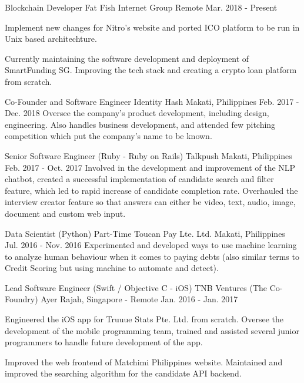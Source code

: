 
\begin{cventries}
    \cventry
        {Blockchain Developer}
        {Fat Fish Internet Group}
        {Remote}
        {Mar. 2018 - Present}
        {
            \begin{cvitems}
                \item
                    {Implement new changes for Nitro's website and ported ICO platform to be run in Unix based architechture.}
                \item
                    {Currently maintaining the software development and deployment of SmartFunding SG. Improving the tech stack and creating a crypto loan platform from scratch.}
            \end{cvitems}
        }

    \cventry
        {Co-Founder and Software Engineer}
        {Identity Hash}
        {Makati, Philippines}
        {Feb. 2017 - Dec. 2018}
        {Oversee the company’s product development, including design, engineering. Also handles business development, and attended few pitching competition which put the company’s name to be known.}
        
    \cventry
        {Senior Software Engineer (Ruby - Ruby on Rails)}
        {Talkpush}
        {Makati, Philippines}
        {Feb. 2017 - Oct. 2017}
        {Involved in the development and improvement of the NLP chatbot, created a successful implementation of candidate search and filter feature, which led to rapid increase of candidate completion rate. Overhauled the interview creator feature so that answers can either be video, text, audio, image, document and custom web input.}
    
    \cventry
        {Data Scientist (Python) Part-Time}
        {Toucan Pay Lte. Ltd.}
        {Makati, Philippines}
        {Jul. 2016 - Nov. 2016}
        {Experimented and developed ways to use machine learning to analyze human behaviour when it comes to paying debts (also similar terms to Credit Scoring but using machine to automate and detect).}
        
    \cventry
        {Lead Software Engineer (Swift / Objective C - iOS)}
        {TNB Ventures (The Co-Foundry)}
        {Ayer Rajah, Singapore - Remote}
        {Jan. 2016 - Jan. 2017}
        {
            \begin{cvitems}
                \item
                    {Engineered the iOS app for Truuue Stats Pte. Ltd. from scratch. Oversee the development of the mobile programming team, trained and assisted several junior programmers to handle future development of the app.}
                \item
                    {Improved the web frontend of Matchimi Philippines website. Maintained and improved the searching algorithm for the candidate API backend.}
            \end{cvitems}
        }
    

\end{cventries}
